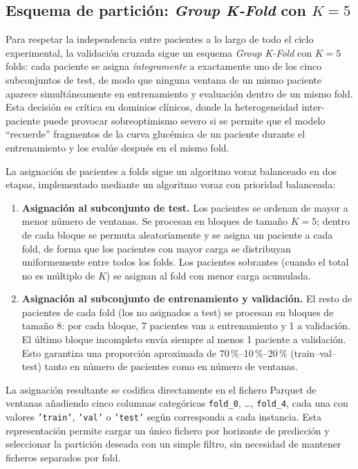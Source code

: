 \subsection{Esquema de partición: \emph{Group K-Fold} con $K=5$}
\label{subsec:group_kfold_implementacion}

Para respetar la independencia entre pacientes a lo largo de todo el ciclo experimental, la validación cruzada sigue un esquema \emph{Group K-Fold} con $K=5$ folds: cada paciente se asigna \emph{íntegramente} a exactamente uno de los cinco subconjuntos de test, de modo que ninguna ventana de un mismo paciente aparece simultáneamente en entrenamiento y evaluación dentro de un mismo fold. Esta decisión es crítica en dominios clínicos, donde la heterogeneidad inter-paciente puede provocar sobreoptimismo severo si se permite que el modelo ``recuerde'' fragmentos de la curva glucémica de un paciente durante el entrenamiento y los evalúe después en el mismo fold.

La asignación de pacientes a folds sigue un algoritmo voraz balanceado en dos etapas, implementado mediante un algoritmo voraz con prioridad balanceada:

\begin{enumerate}
    \item \textbf{Asignación al subconjunto de test.} Los pacientes se ordenan de mayor a menor número de ventanas. Se procesan en bloques de tamaño $K=5$; dentro de cada bloque se permuta aleatoriamente y se asigna un paciente a cada fold, de forma que los pacientes con mayor carga se distribuyan uniformemente entre todos los folds. Los pacientes sobrantes (cuando el total no es múltiplo de $K$) se asignan al fold con menor carga acumulada.

    \item \textbf{Asignación al subconjunto de entrenamiento y validación.} El resto de pacientes de cada fold (los no asignados a test) se procesan en bloques de tamaño 8: por cada bloque, 7 pacientes van a entrenamiento y 1 a validación. El último bloque incompleto envía siempre al menos 1 paciente a validación. Esto garantiza una proporción aproximada de 70\,\%--10\,\%--20\,\% (train--val--test) tanto en número de pacientes como en número de ventanas.
\end{enumerate}

La asignación resultante se codifica directamente en el fichero Parquet de ventanas añadiendo cinco columnas categóricas \texttt{fold\_0}, \ldots, \texttt{fold\_4}, cada una con valores \texttt{'train'}, \texttt{'val'} o \texttt{'test'} según corresponda a cada instancia. Esta representación permite cargar un único fichero por horizonte de predicción y seleccionar la partición deseada con un simple filtro, sin necesidad de mantener ficheros separados por fold.

